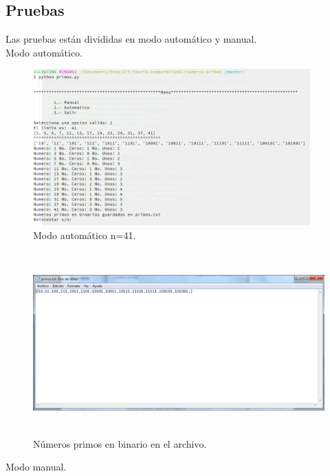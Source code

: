 	\subsection{Pruebas}
	Las pruebas están divididas en modo automático y manual.
	\\{\large Modo automático.}
		\begin{figure}[H]
			\begin{center}
				\includegraphics[width=\linewidth, height=6cm]{img/primos-automatico.png}
				\caption{Modo automático n=41.}
				\label{fig:primos1}
			\end{center}
		\end{figure}
			\begin{figure}[H]
				\begin{center}
					\includegraphics[width=\linewidth, height=7cm]{img/primos-automatico-salida.png}
					\caption{Números primos en binario en el archivo.}
					\label{fig:primos2}
				\end{center}
			\end{figure}
	{\large Modo manual.}
